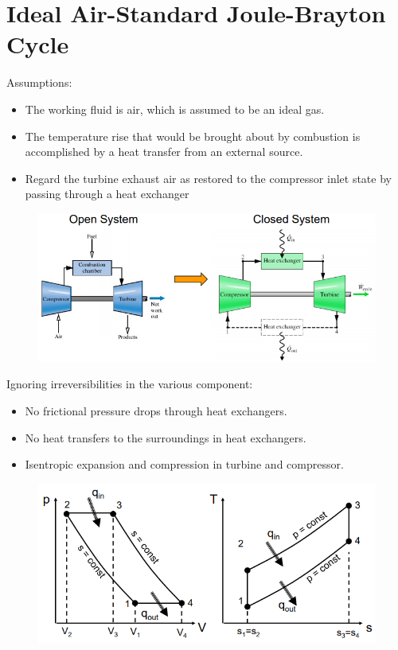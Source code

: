 \documentclass[class=report, crop=false, 12pt,a4paper]{standalone}
\numberwithin{equation}{section}
\begin{document}
\section{Ideal Air-Standard Joule-Brayton Cycle}
Assumptions:
\begin{itemize}[noitemsep]
  \item The working fluid is air, which is assumed to be an ideal gas. 
  \item The temperature rise that would be brought about by combustion is accomplished by a heat transfer from an external source.
  \item Regard the turbine exhaust air as restored to the compressor inlet state by passing through a heat exchanger
\end{itemize}
\begin{figure}[H]
  \centering
  \includegraphics[width = 1 \textwidth]{../img/diagram152.png}
  \caption{}
\end{figure}
Ignoring irreversibilities in the various component:
\begin{itemize}[noitemsep]
  \item No frictional pressure drops through heat exchangers. 
  \item No heat transfers to the surroundings in heat exchangers.
  \item Isentropic expansion and compression in turbine and compressor.
\end{itemize}
\begin{figure}[H]
  \centering
  \includegraphics[width = 0.9 \textwidth]{../img/diagram153.png}
  \caption{}
\end{figure}
\end{document}
